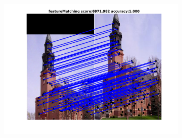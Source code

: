 \documentclass[
	fontsize=12pt,
	paper=a4,
	twoside=false,
	numbers=noenddot,
	plainheadsepline,
	toc=listof,
	toc=bibliography
]{scrartcl}
\begin{document}
\begin{figure}[h]
\begin{subfigure}[b]{0.33\textwidth}
		\includegraphics[scale=0.25]{"fig_ver2608/RealImages/ImgTrafo/anchor_descr/using_cpd_afftrafo/fi_2_featureMatching"} 
	\end{subfigure} 	
	

\end{figure}
\end{document}
